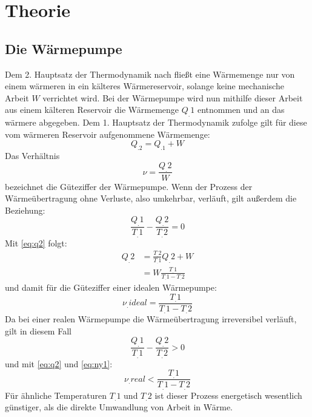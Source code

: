 
\section{Theorie}
\label{sec:Theorie}

\subsection{Die Wärmepumpe}
Dem 2. Hauptsatz der Thermodynamik nach fließt eine Wärmemenge nur von  einem  wärmeren in ein kälteres Wärmereservoir, solange keine mechanische Arbeit $W$ verrichtet wird.
Bei der Wärmepumpe wird nun mithilfe dieser Arbeit aus einem kälteren Reservoir die Wärmemenge $Q_.{1}$ entnommen und an das wärmere abgegeben. Dem 1. Hauptsatz der Thermodynamik zufolge gilt für diese vom wärmeren Reservoir aufgenommene Wärmemenge:
\begin{equation}
Q_.2 = Q_.1 + W \label{eq:q2}
\end{equation}
Das Verhältnis 
\begin{equation}
\nu = \frac{Q_.{2}}{W} \label{eq:ny1}
\end{equation}
bezeichnet die Güteziffer der Wärmepumpe.
Wenn der Prozess der Wärmeübertragung ohne Verluste, also umkehrbar, verläuft, gilt außerdem die Beziehung\cite{V206}:
\begin{equation}
\frac{Q_.{1}}{T_.{1}}-\frac{Q_.{2}}{T_.{2}} = 0 
\end{equation}
Mit \eqref{eq:q2} folgt:
\begin{align*}
Q_.{2} &= \frac{T_.{2}}{T_.{1}}Q_.{2} + W\\
	  &= W \frac{T_.{1}}{T_.{1}-T_.{2}} 
\end{align*}
und damit für die Güteziffer einer idealen Wärmepumpe\cite{V206}:
\begin{equation}
\nu_.{ideal} = \frac{T_.{1}}{T_.{1}-T_.{2}} \label{eq:nyideal}
\end{equation}
Da bei einer realen Wärmepumpe die Wärmeübertragung irreversibel verläuft, gilt in diesem Fall
\begin{equation}
\frac{Q_.{1}}{T_.{1}}-\frac{Q_.{2}}{T_.{2}} > 0 \label{eq:diffreal}
\end{equation}
und mit \eqref{eq:q2} und \eqref{eq:ny1}:
\begin{equation}
\nu_.{real} < \frac{T_.{1}}{T_.{1}-T_.{2}} \label{eq:nyreal} 
\end{equation}
Für ähnliche Temperaturen $T_.{1}$ und $T_.{2}$ ist dieser Prozess energetisch wesentlich günstiger, als die direkte Umwandlung von Arbeit in Wärme.\cite{V206}
